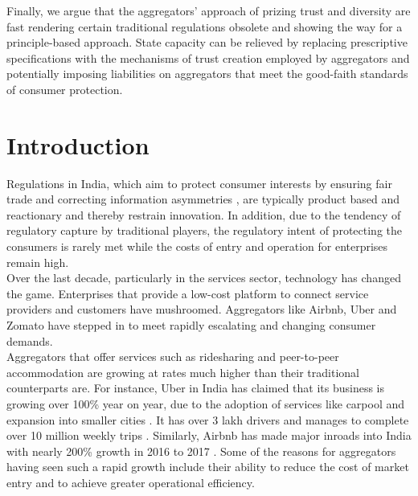 \documentclass[a4paper, 12pt, twoside]{article}
\begin{document}
                 Finally, we argue that the aggregators' approach of prizing trust and diversity are fast rendering certain traditional regulations obsolete and showing the way for a principle-based approach. State capacity can be relieved by replacing prescriptive specifications with the mechanisms of trust creation employed by aggregators and potentially imposing liabilities on aggregators that meet the good-faith standards of consumer protection. 

        
                    
            \newpage
                    \section{Introduction}
                 Regulations in India, which aim to protect consumer interests by ensuring fair trade and correcting information asymmetries \parencite{dudley2012regulation}, are typically product based and reactionary and thereby restrain innovation. In addition, due to the tendency of regulatory capture by traditional players, the regulatory intent of protecting the consumers is rarely met while the costs of entry and operation for enterprises remain high. \\
                    
                   Over the last decade, particularly in the services sector, technology has changed the game. Enterprises that provide a low-cost platform to connect service providers and customers have mushroomed. Aggregators like Airbnb, Uber and Zomato have stepped in to meet rapidly escalating and changing consumer demands. \\
                   
                   Aggregators that offer services such as ridesharing and peer-to-peer accommodation are growing at rates much higher than their traditional counterparts are. For instance, Uber in India has claimed that its business is growing over 100\% year on year, due to the adoption of services like carpool and expansion into smaller cities \parencite{PTI2017}. It has over 3 lakh drivers and manages to complete over 10 million weekly trips \parencite{PTI2018}. Similarly, Airbnb has made major inroads into India with nearly 200\% growth in 2016 to 2017 \parencite{LaghateG}. Some of the reasons for aggregators having seen such a rapid growth include their ability to reduce the cost of market entry and to achieve greater operational efficiency. \\ 
                    
\end{document}
